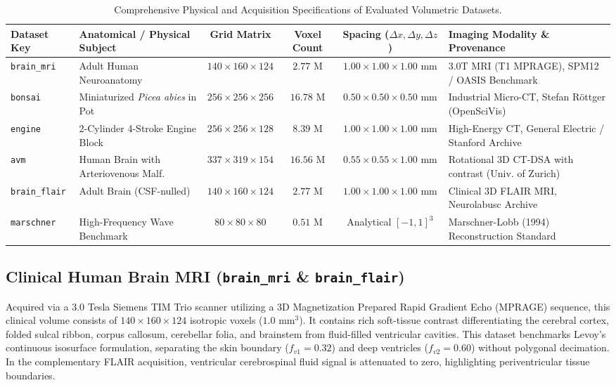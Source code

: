 \documentclass[10pt,twocolumn,a4paper]{article}
\begin{document}
\begin{table}[t]
\centering
\small
\caption{Comprehensive Physical and Acquisition Specifications of Evaluated Volumetric Datasets.}
\label{tab:datasets}
\begin{tabular}{@{}llcccl@{}}
\toprule
\textbf{Dataset Key} & \textbf{Anatomical / Physical Subject} & \textbf{Grid Matrix} & \textbf{Voxel Count} & \textbf{Spacing ($\Delta x, \Delta y, \Delta z$)} & \textbf{Imaging Modality \& Provenance} \\ \midrule
\texttt{brain\_mri} & Adult Human Neuroanatomy & $140 \times 160 \times 124$ & $2.77\text{ M}$ & $1.00 \times 1.00 \times 1.00\text{ mm}$ & 3.0T MRI (T1 MPRAGE), SPM12 / OASIS Benchmark \\
\texttt{bonsai} & Miniaturized \textit{Picea abies} in Pot & $256 \times 256 \times 256$ & $16.78\text{ M}$ & $0.50 \times 0.50 \times 0.50\text{ mm}$ & Industrial Micro-CT, Stefan R\"ottger (OpenSciVis) \\
\texttt{engine} & 2-Cylinder 4-Stroke Engine Block & $256 \times 256 \times 128$ & $8.39\text{ M}$ & $1.00 \times 1.00 \times 1.00\text{ mm}$ & High-Energy CT, General Electric / Stanford Archive \\
\texttt{avm} & Human Brain with Arteriovenous Malf. & $337 \times 319 \times 154$ & $16.56\text{ M}$ & $0.55 \times 0.55 \times 1.00\text{ mm}$ & Rotational 3D CT-DSA with contrast (Univ. of Zurich) \\
\texttt{brain\_flair} & Adult Brain (CSF-nulled) & $140 \times 160 \times 124$ & $2.77\text{ M}$ & $1.00 \times 1.00 \times 1.00\text{ mm}$ & Clinical 3D FLAIR MRI, Neurolabusc Archive \\
\texttt{marschner} & High-Frequency Wave Benchmark & $80 \times 80 \times 80$ & $0.51\text{ M}$ & Analytical $[-1, 1]^3$ & Marschner-Lobb (1994) Reconstruction Standard \\ \bottomrule
\end{tabular}
\end{table}

\subsection{Clinical Human Brain MRI (\texttt{brain\_mri} \& \texttt{brain\_flair})}
Acquired via a 3.0 Tesla Siemens TIM Trio scanner utilizing a 3D Magnetization Prepared Rapid Gradient Echo (MPRAGE) sequence, this clinical volume consists of $140 \times 160 \times 124$ isotropic voxels ($1.0\text{ mm}^3$). It contains rich soft-tissue contrast differentiating the cerebral cortex, folded sulcal ribbon, corpus callosum, cerebellar folia, and brainstem from fluid-filled ventricular cavities. This dataset benchmarks Levoy's continuous isosurface formulation, separating the skin boundary ($f_{v1} = 0.32$) and deep ventricles ($f_{v2} = 0.60$) without polygonal decimation. In the complementary FLAIR acquisition, ventricular cerebrospinal fluid signal is attenuated to zero, highlighting periventricular tissue boundaries.
\end{document}

